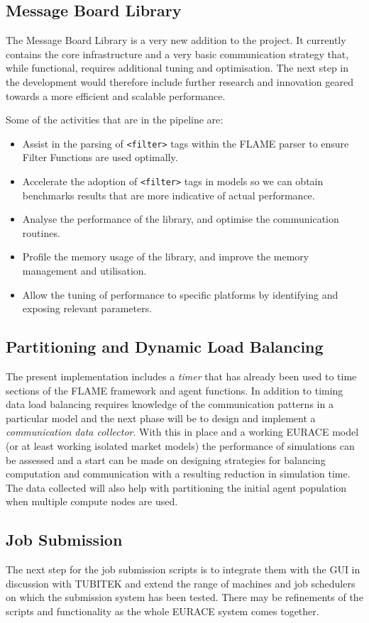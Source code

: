 \subsection{Message Board Library}

The Message Board Library is a very new addition to the project. It currently contains the core infrastructure and a very basic communication strategy that, while functional, requires additional tuning and optimisation. The next step in the development would therefore include further research and innovation geared towards a more efficient and scalable performance. 

Some of the activities that are in the pipeline are:
\begin{itemize}
\item Assist in the parsing of \texttt{<filter>} tags within the FLAME parser to ensure Filter Functions are used optimally.
\item Accelerate the adoption of \texttt{<filter>} tags in models so we can obtain benchmarks results that are more indicative of actual performance.
\item Analyse the  performance of the library, and optimise the communication routines.
\item Profile the memory usage of the library, and improve the memory management and utilisation.
\item Allow the tuning of performance to specific platforms by identifying and exposing relevant parameters.
\end{itemize} 

\subsection{Partitioning and Dynamic Load Balancing}

The present implementation includes a \textit{timer} that has already been used to time sections of the FLAME framework and agent functions. In addition to timing data load balancing requires knowledge of the communication patterns in a particular model and the next phase will be to design and implement a \textit{communication data collector}. With this in place and a working EURACE model (or at least working isolated market models) the performance of simulations can be assessed and a start can be made on designing strategies for balancing computation and communication with a resulting reduction in simulation time. The data collected will also help with partitioning the initial agent population when multiple compute nodes are used.

\subsection{Job Submission}

The next step for the job submission scripts is to integrate them with the GUI in discussion with TUBITEK and extend the range of machines and job schedulers on which the submission system has been tested. There may be refinements of the scripts and functionality as the whole EURACE system comes together. 
